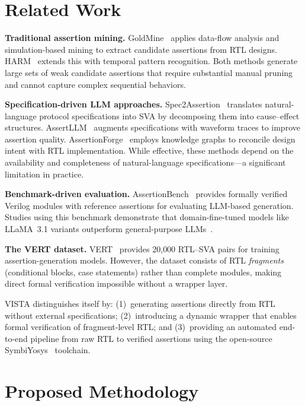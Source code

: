 \documentclass[conference]{IEEEtran}
\begin{document}
\section{Related Work}
\label{sec:related}

\textbf{Traditional assertion mining.}
GoldMine~\cite{goldmine} applies data-flow analysis and simulation-based mining to extract candidate assertions from RTL designs. HARM~\cite{harm} extends this with temporal pattern recognition. Both methods generate large sets of weak candidate assertions that require substantial manual pruning and cannot capture complex sequential behaviors.

\textbf{Specification-driven LLM approaches.}
Spec2Assertion~\cite{spec2assertion} translates natural-language protocol specifications into SVA by decomposing them into cause--effect structures. AssertLLM~\cite{assertllm} augments specifications with waveform traces to improve assertion quality. AssertionForge~\cite{assertionforge} employs knowledge graphs to reconcile design intent with RTL implementation. While effective, these methods depend on the availability and completeness of natural-language specifications---a significant limitation in practice.

\textbf{Benchmark-driven evaluation.}
AssertionBench~\cite{assertionbench} provides formally verified Verilog modules with reference assertions for evaluating LLM-based generation. Studies using this benchmark demonstrate that domain-fine-tuned models like LLaMA~3.1 variants outperform general-purpose LLMs~\cite{enhancing_llm_hw}.

\textbf{The VERT dataset.}
VERT~\cite{vert} provides 20{,}000 RTL--SVA pairs for training assertion-generation models. However, the dataset consists of RTL \emph{fragments} (conditional blocks, case statements) rather than complete modules, making direct formal verification impossible without a wrapper layer.

VISTA distinguishes itself by: (1)~generating assertions directly from RTL without external specifications; (2)~introducing a dynamic wrapper that enables formal verification of fragment-level RTL; and (3)~providing an automated end-to-end pipeline from raw RTL to verified assertions using the open-source SymbiYosys~\cite{symbiyosys} toolchain.

\section{Proposed Methodology}
\label{sec:methodology}
\end{document}
